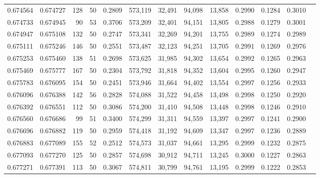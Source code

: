 \begin{tabular}{rrrrrrrrrrrrr}
0.674564 & 0.674727 &   128 &  50 &                                     0.2809 & 573,119 &  32,491 &  94,098 &  13,858 & 0.2990 & 0.1284 & 0.3010 \\
0.674733 & 0.674945 &    90 &  53 &                                     0.3706 & 573,209 &  32,401 &  94,151 &  13,805 & 0.2988 & 0.1279 & 0.3001 \\
0.674947 & 0.675108 &   132 &  50 &                                     0.2747 & 573,341 &  32,269 &  94,201 &  13,755 & 0.2989 & 0.1274 & 0.2989 \\
0.675111 & 0.675246 &   146 &  50 &                                     0.2551 & 573,487 &  32,123 &  94,251 &  13,705 & 0.2991 & 0.1269 & 0.2976 \\
0.675253 & 0.675460 &   138 &  51 &                                     0.2698 & 573,625 &  31,985 &  94,302 &  13,654 & 0.2992 & 0.1265 & 0.2963 \\
0.675469 & 0.675777 &   167 &  50 &                                     0.2304 & 573,792 &  31,818 &  94,352 &  13,604 & 0.2995 & 0.1260 & 0.2947 \\
0.675783 & 0.676095 &   154 &  50 &                                     0.2451 & 573,946 &  31,664 &  94,402 &  13,554 & 0.2997 & 0.1256 & 0.2933 \\
0.676096 & 0.676388 &   142 &  56 &                                     0.2828 & 574,088 &  31,522 &  94,458 &  13,498 & 0.2998 & 0.1250 & 0.2920 \\
0.676392 & 0.676551 &   112 &  50 &                                     0.3086 & 574,200 &  31,410 &  94,508 &  13,448 & 0.2998 & 0.1246 & 0.2910 \\
0.676560 & 0.676686 &    99 &  51 &                                     0.3400 & 574,299 &  31,311 &  94,559 &  13,397 & 0.2997 & 0.1241 & 0.2900 \\
0.676696 & 0.676882 &   119 &  50 &                                     0.2959 & 574,418 &  31,192 &  94,609 &  13,347 & 0.2997 & 0.1236 & 0.2889 \\
0.676883 & 0.677089 &   155 &  52 &                                     0.2512 & 574,573 &  31,037 &  94,661 &  13,295 & 0.2999 & 0.1232 & 0.2875 \\
0.677093 & 0.677270 &   125 &  50 &                                     0.2857 & 574,698 &  30,912 &  94,711 &  13,245 & 0.3000 & 0.1227 & 0.2863 \\
0.677271 & 0.677391 &   113 &  50 &                                     0.3067 & 574,811 &  30,799 &  94,761 &  13,195 & 0.2999 & 0.1222 & 0.2853 \\

\end{tabular}

